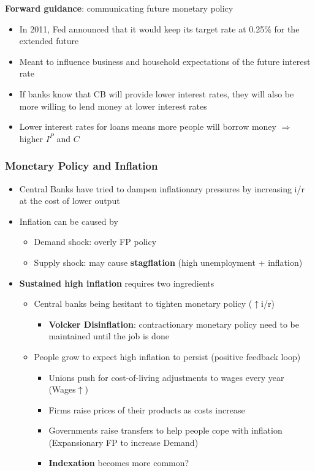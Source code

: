 \documentclass{article}
\begin{document}
\begin{multicols}{2}
\begin{itemize}
\begin{itemize}
    \end{itemize}
\end{itemize}
\textbf{Forward guidance}: communicating future monetary policy
\begin{itemize}
	\item In 2011, Fed announced that it would keep its target rate at 0.25\% for the extended future
	\item Meant to influence business and household expectations of the future interest rate
	\item If banks know that CB will provide lower interest rates, they will also be more willing to lend money at lower interest rates
	\item Lower interest rates for loans means more people will borrow money $\Rightarrow$ higher $I^P$ and $C$
\end{itemize}
\subsubsection{Monetary Policy and Inflation}
\begin{itemize}
	\item Central Banks have tried to dampen inflationary pressures by increasing i/r at the cost of lower output
	\item Inflation can be caused by
	\begin{itemize}
		\item Demand shock: overly FP policy
		\item Supply shock: may cause \textbf{stagflation} (high unemployment + inflation)
	\end{itemize}
    \item \textbf{Sustained high inflation} requires two ingredients
    \begin{itemize}
    	\item Central banks being hesitant to tighten monetary policy ($\uparrow$i/r)
    	\begin{itemize}
    		\item \textbf{Volcker Disinflation}: contractionary monetary policy need to be maintained until the job is done
    	\end{itemize}
    	\item People grow to expect high inflation to persist (positive feedback loop)
    	\begin{itemize}
    		\item Unions push for cost-of-living adjustments to wages every year (Wages$\uparrow$)
    		\item Firms raise prices of their products as costs increase
    		\item Governments raise transfers to help people cope with inflation (Expansionary FP to increase Demand)
    		\item \textbf{Indexation} becomes more common?
    	\end{itemize}
    \end{itemize}
\end{itemize}

\end{multicols}
\end{document}

